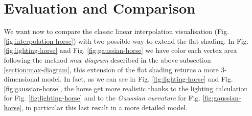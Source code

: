 \section{Evaluation and Comparison}
We want now to compare the classic linear interpolation visualisation (Fig. \ref{fig:interpolation-horse}) with two possible way to extend the flat shading. In Fig. \ref{fig:lighting-horse} and Fig. \ref{fig:gaussian-horse} we have color each vertex area following the method \textit{max diagram} described in the above subsection \ref{section:max-diagram}, this extension of the flat shading returns a more 3-dimensional model.
In fact, as we can see in Fig. \ref{fig:lighting-horse} and Fig. \ref{fig:gaussian-horse}, the horse get more realistic thanks to the lighting calculation for Fig. \ref{fig:lighting-horse} and to the \textit{Gaussian curvature} for Fig. \ref{fig:gaussian-horse}, in particular this last result in a more detailed model.
